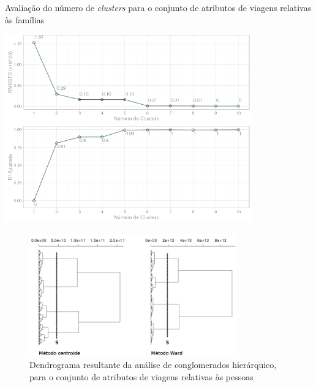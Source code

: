 \begin{grafico}[htb]%
    \caption{\label{graf:rmsstd-r2-cluster-fam-total}Avaliação do número de \textit{clusters} para o conjunto de atributos de viagens relativas às famílias}%
    \begin{center}%
        \includegraphics[width=0.8\textwidth]{./imagens/No-clusters-R2-RMSSTD-familia.png}%
    \end{center}%
\end{grafico}%

\clearpage
\begin{figure}[htb]%
    \caption{\label{fig:cluster-pess-total}Dendrograma resultante da análise de conglomerados hierárquico, para o conjunto de atributos de viagens relativas às pessoas}%
    \begin{center}%
        \includegraphics[width=0.8\textwidth]{./imagens/dendro-hierarq-cluster-pessoa-total-final.png}%
    \end{center}%
\end{figure}%

